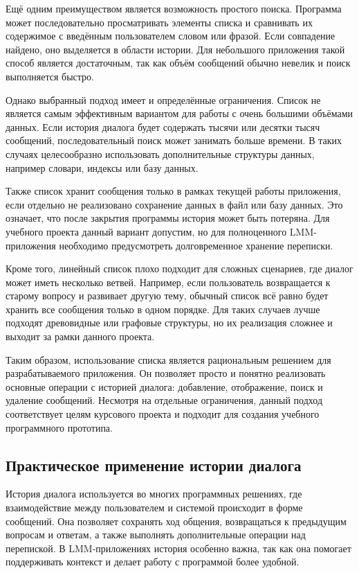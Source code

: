 \documentclass[12pt,a4paper]{article}
\begin{document}
Ещё одним преимуществом является возможность простого поиска. Программа может последовательно просматривать элементы списка и сравнивать их содержимое с введённым пользователем словом или фразой. Если совпадение найдено, оно выделяется в области истории. Для небольшого приложения такой способ является достаточным, так как объём сообщений обычно невелик и поиск выполняется быстро.

Однако выбранный подход имеет и определённые ограничения. Список не является самым эффективным вариантом для работы с очень большими объёмами данных. Если история диалога будет содержать тысячи или десятки тысяч сообщений, последовательный поиск может занимать больше времени. В таких случаях целесообразно использовать дополнительные структуры данных, например словари, индексы или базу данных.

Также список хранит сообщения только в рамках текущей работы приложения, если отдельно не реализовано сохранение данных в файл или базу данных. Это означает, что после закрытия программы история может быть потеряна. Для учебного проекта данный вариант допустим, но для полноценного LMM-приложения необходимо предусмотреть долговременное хранение переписки.

Кроме того, линейный список плохо подходит для сложных сценариев, где диалог может иметь несколько ветвей. Например, если пользователь возвращается к старому вопросу и развивает другую тему, обычный список всё равно будет хранить все сообщения только в одном порядке. Для таких случаев лучше подходят древовидные или графовые структуры, но их реализация сложнее и выходит за рамки данного проекта.

Таким образом, использование списка является рациональным решением для разрабатываемого приложения. Он позволяет просто и понятно реализовать основные операции с историей диалога: добавление, отображение, поиск и удаление сообщений. Несмотря на отдельные ограничения, данный подход соответствует целям курсового проекта и подходит для создания учебного программного прототипа.

\subsection{Практическое применение истории диалога}

История диалога используется во многих программных решениях, где взаимодействие между пользователем и системой происходит в форме сообщений. Она позволяет сохранять ход общения, возвращаться к предыдущим вопросам и ответам, а также выполнять дополнительные операции над перепиской. В LMM-приложениях история особенно важна, так как она помогает поддерживать контекст и делает работу с программой более удобной.
\end{document}
